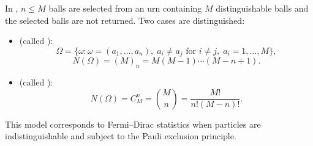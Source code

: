In , $n \leq M$ balls are selected from an urn containing $M$ distinguishable balls and the selected balls are not returned. Two cases are distinguished:
\begin{itemize}
\item {} (called ):
$$\Omega = \{\omega : \omega = (a_1, \ldots, a_n), \; a_i \neq a_j \text{ for } i \neq j, \; a_i = 1, \ldots, M\},$$
$$N(\Omega) = (M)_n = M(M-1)\cdots(M-n+1).$$

\item {} (called ):
$$N(\Omega) = C_M^n = \binom{M}{n} = \frac{M!}{n!(M-n)!}.$$
\end{itemize}
This model corresponds to Fermi--Dirac statistics when particles are indistinguishable and subject to the Pauli exclusion principle.
